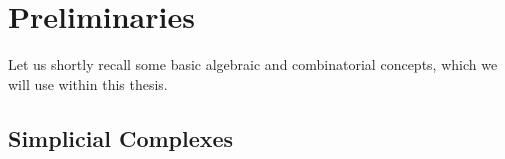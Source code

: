 
\manualmark
{}

\chapter*{Preliminaries}

\label{Preliminaries}

Let us shortly recall some basic algebraic and combinatorial concepts, which we will use within this thesis.

\section*{Simplicial Complexes}

